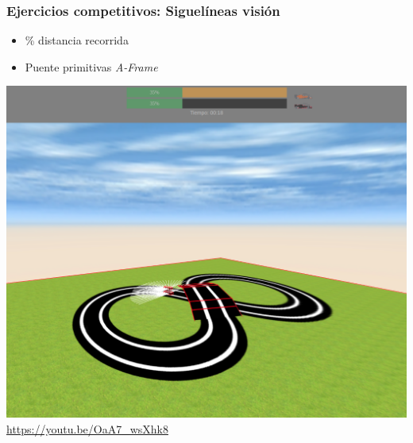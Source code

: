 \documentclass[xcolor={table}]{beamer}
\begin{document}
		\begin{frame}
			\frametitle{\LARGE{Ejercicios competitivos: Siguelíneas visión}}
			   \begin{minipage}{.50\textwidth}
      \begin{itemize}
          \begin{itemize}{}\itemsep5pt
              \item \% distancia recorrida
              \item Puente primitivas \textit{A-Frame}
          \end{itemize}
       \end{itemize}
    \end{minipage}
		\begin{minipage}{.48\textwidth}	
	         \href{https://youtu.be/OaA7_wsXhk8}{
            \includegraphics[scale=0.14]{img/evaluator_follow_line.png}}
            \scriptsize{\url{https://youtu.be/OaA7_wsXhk8}} 
        \end{minipage}
		\end{frame}
		
\end{document}
